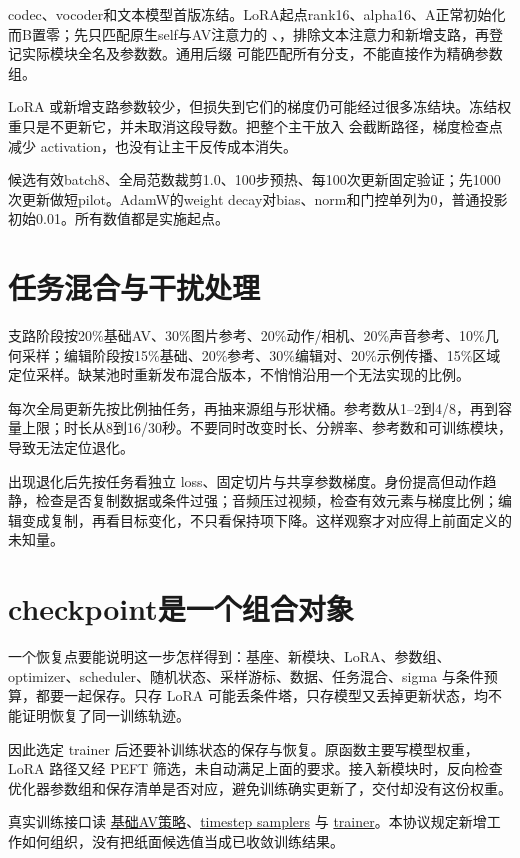codec、vocoder和文本模型首版冻结。LoRA起点rank16、alpha16、A正常初始化而B置零；先只匹配原生self与AV注意力的 、，排除文本注意力和新增支路，再登记实际模块全名及参数数。通用后缀  可能匹配所有分支，不能直接作为精确参数组。

LoRA 或新增支路参数较少，但损失到它们的梯度仍可能经过很多冻结块。冻结权重只是不更新它，并未取消这段导数。把整个主干放入  会截断路径，梯度检查点减少 activation，也没有让主干反传成本消失。

候选有效batch8、全局范数裁剪1.0、100步预热、每100次更新固定验证；先1000次更新做短pilot。AdamW的weight decay对bias、norm和门控单列为0，普通投影初始0.01。所有数值都是实施起点。

\section{任务混合与干扰处理}\label{seedance-m25-ux4efbux52a1ux6df7ux5408ux4e0eux5e72ux6270ux5904ux7406}

支路阶段按20\%基础AV、30\%图片参考、20\%动作/相机、20\%声音参考、10\%几何采样；编辑阶段按15\%基础、20\%参考、30\%编辑对、20\%示例传播、15\%区域定位采样。缺某池时重新发布混合版本，不悄悄沿用一个无法实现的比例。

每次全局更新先按比例抽任务，再抽来源组与形状桶。参考数从1--2到4/8，再到容量上限；时长从8到16/30秒。不要同时改变时长、分辨率、参考数和可训练模块，导致无法定位退化。

出现退化后先按任务看独立 loss、固定切片与共享参数梯度。身份提高但动作趋静，检查是否复制数据或条件过强；音频压过视频，检查有效元素与梯度比例；编辑变成复制，再看目标变化，不只看保持项下降。这样观察才对应得上前面定义的未知量。

\section{checkpoint是一个组合对象}\label{seedance-m25-checkpointux662fux4e00ux4e2aux7ec4ux5408ux5bf9ux8c61}

一个恢复点要能说明这一步怎样得到：基座、新模块、LoRA、参数组、optimizer、scheduler、随机状态、采样游标、数据、任务混合、sigma 与条件预算，都要一起保存。只存 LoRA 可能丢条件塔，只存模型又丢掉更新状态，均不能证明恢复了同一训练轨迹。

因此选定 trainer 后还要补训练状态的保存与恢复。原函数主要写模型权重，LoRA 路径又经 PEFT 筛选，未自动满足上面的要求。接入新模块时，反向检查优化器参数组和保存清单是否对应，避免训练确实更新了，交付却没有这份权重。

真实训练接口读 \href{https://github.com/Lightricks/LTX-2/blob/bd92a5f408eb8c99f8c05e9fe2fcaaec8b56b638/packages/ltx-trainer/src/ltx_trainer/training_strategies/text_to_video.py}{基础AV策略}、\href{https://github.com/Lightricks/LTX-2/blob/bd92a5f408eb8c99f8c05e9fe2fcaaec8b56b638/packages/ltx-trainer/src/ltx_trainer/timestep_samplers.py}{timestep samplers} 与 \href{https://github.com/Lightricks/LTX-2/blob/bd92a5f408eb8c99f8c05e9fe2fcaaec8b56b638/packages/ltx-trainer/src/ltx_trainer/trainer.py}{trainer}。本协议规定新增工作如何组织，没有把纸面候选值当成已收敛训练结果。
